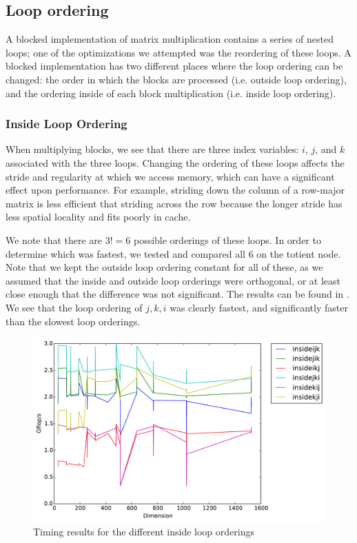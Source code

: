 \subsection{Loop ordering}\label{sec:loopordering}
A blocked implementation of matrix multiplication contains a series of nested
loops; one of the optimizations we attempted was the reordering of these loops.
A blocked implementation has two different places where the loop ordering can
be changed: the order in which the blocks are processed (i.e. outside loop
ordering), and the ordering inside of each block multiplication (i.e. inside
loop ordering).

\subsubsection{Inside Loop Ordering}
When multiplying blocks, we see that there are three index variables: $i$, $j$,
and $k$ associated with the three loops. Changing the ordering of these loops
affects the stride and regularity at which we access memory, which can have a
significant effect upon performance. For example, striding down the column of a
row-major matrix is less efficient that striding across the row because the
longer stride has less spatial locality and fits poorly in cache.

We note that there are $3! = 6$ possible orderings of these loops. In order to
determine which was fastest, we tested and compared all 6 on the totient node.
Note that we kept the outside loop ordering constant for all of these, as we
assumed that the inside and outside loop orderings were orthogonal, or at least
close enough that the difference was not significant. The results can be found
in . We see that the loop ordering of $j,k,i$ was
clearly fastest, and significantly faster than the slowest loop orderings.

\begin{figure}[hh]
  \centering
  \includegraphics[width=\textwidth]{img/timing_insideloops.pdf}
  \caption{Timing results for the different inside loop orderings}
  \label{fig:insideloop}
\end{figure}


